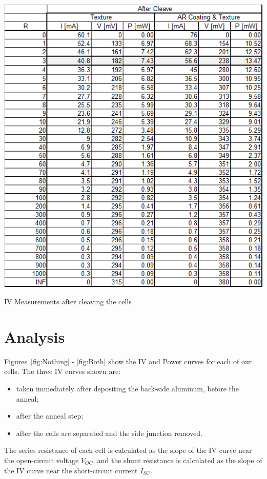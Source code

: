 \documentclass[letter,12pt]{article}
\begin{document}
	\begin{table}[h!]
		\centering
		\includegraphics[width=.9\textwidth]{./Images/Tables/After_Cleave_2.png}
		\caption{IV Measurements after cleaving the cells}
		\label{tab:After_Cleave_2}
	\end{table}

\FloatBarrier
\section{Analysis}

	Figures~\ref{fig:Nothing} - \ref{fig:Both} show the IV and Power curves for each of our cells.  The three IV curves shown are: 
	\begin{itemize}
		\item taken immediately after depositing the back-side aluminum, before the anneal;
		\item after the anneal step;
		\item after the cells are separated and the side junction removed.
	\end{itemize}
	
	The series resistance of each cell is calculated as the slope of the IV curve near the open-circuit voltage $V_{OC}$, and the shunt resistance is calculated as the slope of the IV curve near the short-circuit current $I_{SC}$.
	
\end{document}
